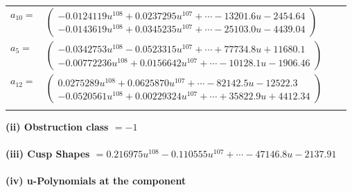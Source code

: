 \documentclass[1p]{elsarticle_modified}
\theoremstyle{definition}
\begin{document}
\begin{tabular}{m{7pt} m{180pt} m{7pt} m{180pt} }
\flushright $a_{10}=$&$\begin{pmatrix}-0.0124119 u^{108}+0.0237295 u^{107}+\cdots-13201.6 u-2454.64\\-0.0143619 u^{108}+0.0345235 u^{107}+\cdots-25103.0 u-4439.04\end{pmatrix}$ \\
\flushright $a_{5}=$&$\begin{pmatrix}-0.0342753 u^{108}-0.0523315 u^{107}+\cdots+77734.8 u+11680.1\\-0.00772236 u^{108}+0.0156642 u^{107}+\cdots-10128.1 u-1906.46\end{pmatrix}$ \\
\flushright $a_{12}=$&$\begin{pmatrix}0.0275289 u^{108}+0.0625870 u^{107}+\cdots-82142.5 u-12522.3\\-0.0520561 u^{108}+0.00229324 u^{107}+\cdots+35822.9 u+4412.34\end{pmatrix}$\\&\end{tabular}
\flushleft \textbf{(ii) Obstruction class $= -1$}\\~\\
\flushleft \textbf{(iii) Cusp Shapes $= 0.216975 u^{108}-0.110555 u^{107}+\cdots-47146.8 u-2137.91$}\\~\\
\newpage\renewcommand{\arraystretch}{1}
\flushleft \textbf{(iv) u-Polynomials at the component}\newline \\
\end{document}
